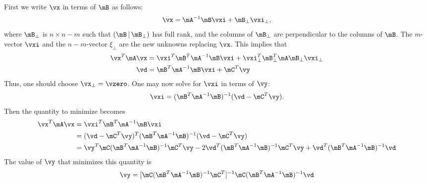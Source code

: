 \documentclass[]{amsart}
\theoremstyle{definition}
\theoremstyle{remark}
\begin{document}
First we write $\vx$ in terms of $\mB$ as follows:
\[
\vx = \mA^{-1} \mB \vxi + \mB_{\perp} \vxi_{\perp},
\]
where $\mB_{\perp}$ is $n \times n-m$ such that $(\mB \, \vert \, \mB_{\perp})$ has full rank, and the columns of $\mB_{\perp}$ are perpendicular to the columns of $\mB$.  The $m$-vector $\vxi$ and the $n-m$-vector $\xi_\perp$ are the new unknowns replacing $\vx$.  This implies that 
\begin{align*}
\vx^T\mA\vx &= \vxi^T \mB^T \mA^{-1} \mB \vxi + \vxi^T_\perp \mB^T_\perp \mA \mB_\perp \vxi_\perp \\
\vd & = \mB^T \mA^{-1} \mB \vxi + \mC^T \vy
\end{align*}
Thus, one should choose $\vx_\perp =\vzero$.  One may now solve for $\vxi$ in terms of $\vy$:
\[
\vxi = (\mB^T \mA^{-1} \mB)^{-1} (\vd - \mC^T \vy).
\]
Then the quantity to minimize becomes
\begin{align*}
\vx^T\mA\vx &= \vxi^T \mB^T \mA^{-1} \mB \vxi \\
& = (\vd - \mC^T \vy)^T (\mB^T \mA^{-1} \mB)^{-1} (\vd - \mC^T \vy) \\
& = \vy^T \mC(\mB^T \mA^{-1} \mB)^{-1} \mC^T \vy - 2\vd^T (\mB^T \mA^{-1} \mB)^{-1} \mC^T \vy + \vd^T (\mB^T \mA^{-1} \mB)^{-1} \vd
\end{align*}
The value of $\vy$ that minimizes this quantity is 
\[
\vy = [\mC(\mB^T \mA^{-1} \mB)^{-1} \mC^T]^{-1} \mC(\mB^T \mA^{-1} \mB)^{-1} \vd
\]
\end{document}
